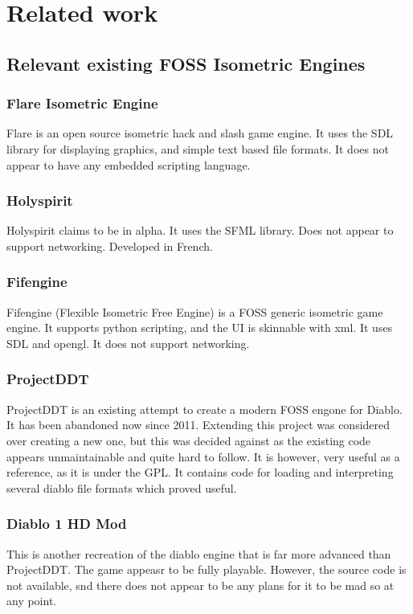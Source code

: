 \section{Related work}
    \subsection{Relevant existing FOSS Isometric Engines}
    	\subsubsection{Flare Isometric Engine}
    	Flare\cite{flare} is an open source isometric hack and slash game engine. It uses the SDL library for displaying graphics, and simple text based file formats.
    	It does not appear to have any embedded scripting language.
    	
    	\subsubsection{Holyspirit}
    	Holyspirit\cite{holyspirit} claims to be in alpha. It uses the SFML library. Does not appear to support networking.
    	Developed in French.
    	
    	\subsubsection{Fifengine}
    	Fifengine\cite{fife} (Flexible Isometric Free Engine) is a FOSS generic isometric game engine.
    	It supports python scripting, and the UI is skinnable with xml.
    	It uses SDL and opengl. It does not support networking.
    	
    	\subsubsection{ProjectDDT}
    	ProjectDDT\cite{ddt} is an existing attempt to create a modern FOSS engone for Diablo.
    	It has been abandoned now since 2011.
    	Extending this project was considered over creating a new one, but this was decided against as the existing code appears unmaintainable and quite hard to follow.
    	It is however, very useful as a reference, as it is under the GPL.
    	It contains code for loading and interpreting several diablo file formats which proved useful.
    	
    	\subsubsection{Diablo 1 HD Mod}
    	This\cite{d1hd} is another recreation of the diablo engine that is far more advanced than ProjectDDT. The game appeasr to be fully playable. However, the source code is not available, snd there does not appear to be any plans for it to be mad so at any point.
